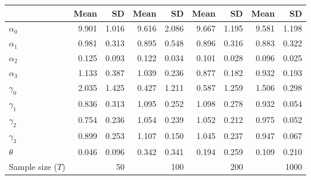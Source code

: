 
\begin{tabular}[t]{lrrrrrrrr}
\toprule
  & Mean & SD & Mean  & SD  & Mean   & SD   & Mean    & SD   \\
\midrule
$\alpha_{0}$ & 9.901 & 1.016 & 9.616 & 2.086 & 9.667 & 1.195 & 9.581 & 1.198\\
$\alpha_{1}$ & 0.981 & 0.313 & 0.895 & 0.548 & 0.896 & 0.316 & 0.883 & 0.322\\
$\alpha_{2}$ & 0.125 & 0.093 & 0.122 & 0.034 & 0.101 & 0.028 & 0.096 & 0.025\\
$\alpha_{3}$ & 1.133 & 0.387 & 1.039 & 0.236 & 0.877 & 0.182 & 0.932 & 0.193\\
$\gamma_{0}$ & 2.035 & 1.425 & 0.427 & 1.211 & 0.587 & 1.259 & 1.506 & 0.298\\
$\gamma_{1}$ & 0.836 & 0.313 & 1.095 & 0.252 & 1.098 & 0.278 & 0.932 & 0.054\\
$\gamma_{2}$ & 0.754 & 0.236 & 1.054 & 0.239 & 1.052 & 0.212 & 0.975 & 0.052\\
$\gamma_{3}$ & 0.899 & 0.253 & 1.107 & 0.150 & 1.045 & 0.237 & 0.947 & 0.067\\
$\theta$ & 0.046 & 0.096 & 0.342 & 0.341 & 0.194 & 0.259 & 0.109 & 0.210\\
Sample size ($T$) &  & 50 &  & 100 &  & 200 &  & 1000\\
\bottomrule
\end{tabular}
